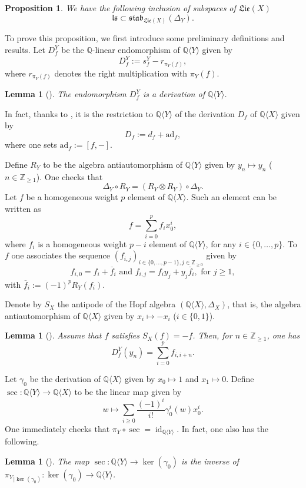 \documentclass[11pt, a4paper]{amsart}
\newtheorem{proposition}[theorem]{Proposition}
\newtheorem{lemma}[theorem]{Lemma}
\numberwithin{equation}{section}
\theoremstyle{definition}
\newcommand{\Q}{\mathbb{Q}}
\newcommand{\QX}{\Q\langle X\rangle}
\newcommand{\QY}{\Q\langle Y\rangle}
\newcommand{\id}{\operatorname{id}}
\newcommand{\Lie}{\mathfrak{Lie}}
\newcommand{\stab}{\mathfrak{stab}}
\begin{document}
\begin{proposition} \label{prop:ls_subset_stab}
    We have the following inclusion of subspaces of $\Lie(X)$
    \[
        \mathfrak{ls} \subset \stab_{\Lie(X)}(\Delta_Y).
    \]
\end{proposition}

\noindent To prove this proposition, we first introduce some preliminary definitions and results. 
Let $D_f^Y$ be the $\Q$-linear endomorphism of $\QY$ given by %
\[
    D_f^Y := s_f^Y - r_{\pi_Y(f)},
\]
where $r_{\pi_Y(f)}$ denotes the right multiplication with $\pi_Y(f)$.
\begin{lemma}[{\cite[Proposition 4.1.4]{Ra02}}]
    The endomorphism $D_f^Y$ is a derivation of $\QY$.
\end{lemma}
In fact, thanks to \cite[Remark 4.1.5]{Ra02}, it is the restriction to $\QY$ of the derivation $D_f$ of $\QX$ given by
\[
    D_f := d_f + \mathrm{ad}_f,
\]
where one sets $\mathrm{ad}_f := [f, -]$.

Define $R_Y$ to be the algebra antiautomorphism of $\QY$ given by $y_n \mapsto y_n$ ($n \in \mathbb{Z}_{\geq 1}$). One checks that
\begin{equation} \label{eq:RY_DeltaY}
    \Delta_Y \circ R_Y = (R_Y \otimes R_Y) \circ \Delta_Y.
\end{equation}
Let $f$ be a homogeneous weight $p$ element of $\QX$. Such an element can be written as
\[
    f = \sum_{i=0}^p f_i x_0^i,
\]
where $f_i$ is a homogeneous weight $p-i$ element of $\QY$, for any $i \in \{0, \dots, p\}$. To $f$ one associates the sequence $(f_{i,j})_{i \in \{0, \dots, p-1\}, j \in \mathbb{Z}_{\geq 0}}$ given by
\[
    f_{i,0} = f_i + \overline{f}_i \text{ and } f_{i,j} = f_i y_j + y_j \overline{f}_i, \text{ for } j \geq 1,
\]
with $\overline{f}_i := (-1)^p R_Y(f_i)$.

Denote by $S_X$ the antipode of the Hopf algebra $(\QX, \Delta_X)$, that is, the algebra antiautomorphism of $\QX$ given by $x_i \mapsto - x_i$ ($i\in\{0,1\}$).
\begin{lemma}[{\cite[Lemma A.2]{Fu11}}] \label{lem:DYf_yn}
    Assume that $f$ satisfies $S_X(f) = - f$. Then, for $n \in \mathbb{Z}_{\geq 1}$, one has
    \[
        D_f^Y(y_n) = \sum_{i=0}^p f_{i,i+n}.
    \]
\end{lemma}

Let $\gamma_0$ be the derivation of $\QX$ given by $x_0 \mapsto 1$ and $x_1 \mapsto 0$. Define $\sec : \QY \to \QX$ to be the linear map given by 
\[
    w \mapsto \sum_{i \geq 0} \frac{(-1)^i}{i!} \gamma_0^i(w) x_0^i.
\]
One immediately checks that $\pi_Y \circ \sec = \id_{\QY}$. In fact, one also has the following.
\begin{lemma}[{\cite[Proposition 4.2.2]{Ra02}}] \label{lem:sec_piY}
    The map $\sec : \QY \to \ker(\gamma_0)$ is the inverse of ${\pi_Y}_{|\ker(\gamma_0)} : \ker(\gamma_0) \to \QY$.
\end{lemma}
\end{document}
